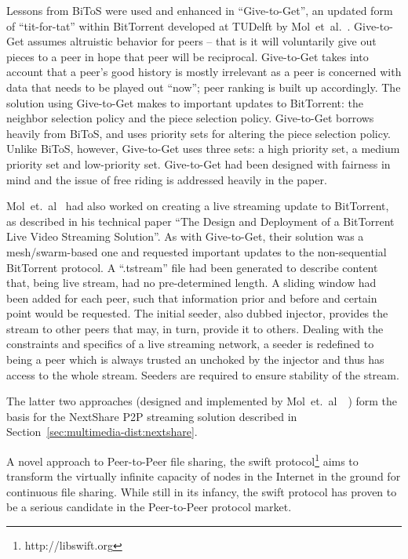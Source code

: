 Lessons from BiToS were used and enhanced in ``Give-to-Get'', an updated form
of ``tit-for-tat'' within BitTorrent developed at TUDelft by
Mol~et~al.~\cite{give-to-get}. Give-to-Get assumes altruistic behavior for
peers -- that is it will voluntarily give out pieces to a peer in hope that
peer will be reciprocal. Give-to-Get takes into account that a peer's good
history is mostly irrelevant as a peer is concerned with data that needs to be
played out ``now''; peer ranking is built up accordingly. The solution using
Give-to-Get makes to important updates to BitTorrent: the neighbor selection
policy and the piece selection policy. Give-to-Get borrows heavily from BiToS,
and uses priority sets for altering the piece selection policy. Unlike BiToS,
however, Give-to-Get uses three sets: a high priority set, a medium priority
set and low-priority set. Give-to-Get had been designed with fairness in mind
and the issue of free riding is addressed heavily in the paper.

Mol~et.~al~\cite{design-p2p-live} had also worked on creating a live streaming
update to BitTorrent, as described in his technical paper ``The Design and
Deployment of a BitTorrent Live Video Streaming Solution''. As with
Give-to-Get, their solution was a mesh/swarm-based one and requested important
updates to the non-sequential BitTorrent protocol. A ``.tstream'' file had
been generated to describe content that, being live stream, had no
pre-determined length. A sliding window had been added for each peer, such
that information prior and before and certain point would be requested. The
initial seeder, also dubbed injector, provides the stream to other peers that
may, in turn, provide it to others. Dealing with the constraints and specifics
of a live streaming network, a seeder is redefined to being a peer which is
always trusted an unchoked by the injector and thus has access to the whole
stream. Seeders are required to ensure stability of the stream.

The latter two approaches (designed and implemented by
Mol~et.~al~\cite{give-to-get}~\cite{design-p2p-live}) form the basis for the
NextShare P2P streaming solution described in
Section~\ref{sec:multimedia-dist:nextshare}.

A novel approach to Peer-to-Peer file sharing, the swift
protocol\footnote{http://libswift.org} aims to transform the virtually
infinite capacity of nodes in the Internet in the ground for continuous file
sharing. While still in its infancy, the swift protocol has proven to be a
serious candidate in the Peer-to-Peer protocol market.

